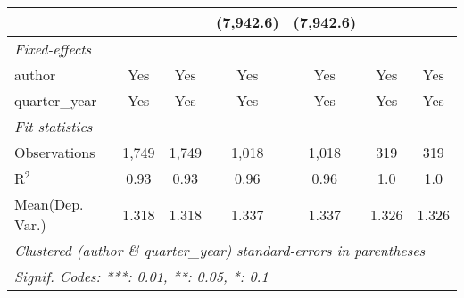 \begin{tabular}{lcccccc}
                                         &                &                & (7,942.6)     & (7,942.6)     &               &   \\   
   \midrule
   \emph{Fixed-effects}\\
   author                                & Yes            & Yes            & Yes           & Yes           & Yes           & Yes\\  
   quarter\_year                         & Yes            & Yes            & Yes           & Yes           & Yes           & Yes\\  
   \midrule
   \emph{Fit statistics}\\
   Observations                          & 1,749          & 1,749          & 1,018         & 1,018         & 319           & 319\\  
   R$^2$                                 & 0.93           & 0.93           & 0.96          & 0.96          & 1.0           & 1.0\\  
Mean(Dep. Var.) & 1.318 & 1.318 & 1.337 & 1.337 & 1.326 & 1.326 \\
   \midrule \midrule
   \multicolumn{7}{l}{\emph{Clustered (author \& quarter\_year) standard-errors in parentheses}}\\
   \multicolumn{7}{l}{\emph{Signif. Codes: ***: 0.01, **: 0.05, *: 0.1}}\\
\end{tabular}
\par\endgroup
